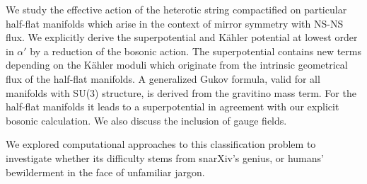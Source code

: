 \documentclass[paperwidth=40in,paperheight=32in,margin=1in,fontscale=0.33]{baposter}
\begin{document}
\begin{poster}
{{\begin{minipage}[t]{.46\textwidth}
		\footnotesize
		We study the effective action of the heterotic string compactified on particular half-flat manifolds which arise in the context of mirror symmetry with NS-NS flux. We explicitly derive the superpotential and K{\"a}hler potential at lowest order in $\alpha'$ by a reduction of the bosonic action. The superpotential contains new terms depending on the K{\"a}hler moduli which originate from the intrinsic geometrical flux of the half-flat manifolds. A generalized Gukov formula, valid for all manifolds with SU(3) structure, is derived from the gravitino mass term. For the half-flat manifolds it leads to a superpotential in agreement with our explicit bosonic calculation. We also discuss the inclusion of gauge fields.
	\end{minipage}
	}

	\vspace{0.25\baselineskip}
	We explored computational approaches to this classification problem to investigate whether its difficulty stems from snarXiv's genius, or humans' bewilderment in the face of unfamiliar jargon.
}

















\end{poster}
\end{document}
